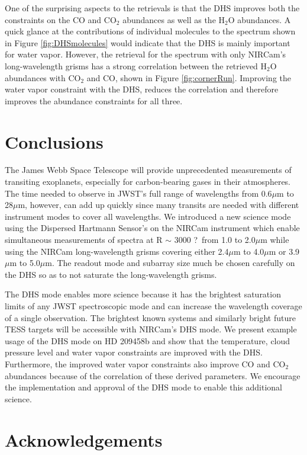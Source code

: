 \documentclass{emulateapj}
\newcommand{\DHSres}{3000 ?}
\begin{document}
One of the surprising aspects to the retrievals is that the DHS improves both the constraints on the CO and CO$_2$ abundances as well as the H$_2$O abundances. A quick glance at the contributions of individual molecules to the spectrum shown in Figure \ref{fig:DHSmolecules} would indicate that the DHS is mainly important for water vapor. However, the retrieval for the spectrum with only NIRCam's long-wavelength grisms has a strong correlation between the retrieved H$_2$O abundances with CO$_2$ and CO, shown in Figure \ref{fig:cornerRun}. Improving the water vapor constraint with the DHS, reduces the correlation and therefore improves the abundance constraints for all three.

\section{Conclusions}

The James Webb Space Telescope will provide unprecedented measurements of transiting exoplanets, especially for carbon-bearing gases in their atmospheres. The time needed to observe in JWST's full range of wavelengths from 0.6$\mu$m to 28$\mu$m, however, can add up quickly since many transits are needed with different instrument modes to cover all wavelengths. We introduced a new science mode using the Dispersed Hartmann Sensor's on the NIRCam instrument which enable simultaneous measurements of spectra at R $\sim$ \DHSres\ from 1.0 to 2.0$\mu$m while using the NIRCam long-wavelength grisms covering either 2.4$\mu$m to 4.0$\mu$m or 3.9$\mu$m to 5.0$\mu$m. The readout mode and subarray size much be chosen carefully on the DHS so as to not saturate the long-wavelength grisms.

The DHS mode enables more science because it has the brightest saturation limits of any JWST spectroscopic mode and can increase the wavelength coverage of a single observation. The brightest known systems and similarly bright future TESS targets will be accessible with NIRCam's DHS mode. We present example usage of the DHS mode on HD 209458b and show that the temperature, cloud pressure level and water vapor constraints are improved with the DHS. Furthermore, the improved water vapor constraints also improve CO and CO$_2$ abundances because of the correlation of these derived parameters. We encourage the implementation and approval of the DHS mode to enable this additional science.

\section{Acknowledgements}
\end{document}
